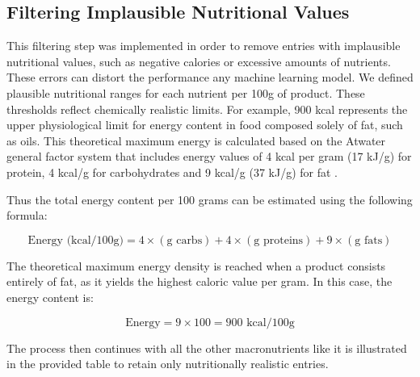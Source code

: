 \subsection{Filtering Implausible Nutritional Values}
This filtering step was implemented in order to remove entries with implausible nutritional values, such as negative calories or excessive amounts of nutrients. These errors can distort  the performance any machine learning model. We defined plausible nutritional ranges for each nutrient per 100g of product. These thresholds reflect chemically realistic limits. 
For example,  900 kcal represents the upper physiological limit for energy content in food composed solely of fat, such as oils. This theoretical maximum energy is calculated based on the Atwater general factor system that includes energy values of 4 kcal per gram (17 kJ/g) for protein, 4 kcal/g for carbohydrates and 9 kcal/g (37 kJ/g) for fat \cite{huelEnergyCalculation}.

Thus the total energy content per 100 grams can be estimated using the following formula:

$$
\text{Energy (kcal/100g)} = 4 \times (\text{g carbs}) + 4 \times (\text{g proteins}) + 9 \times (\text{g fats})
$$

The theoretical maximum energy density is reached when a product consists entirely of fat, as it yields the highest caloric value per gram. In this case, the energy content is:

\[
\text{Energy} = 9 \times 100 = 900 \text{ kcal/100g}
\]

The process then continues with all the other macronutrients like it is illustrated in the provided table to retain only nutritionally realistic entries.

